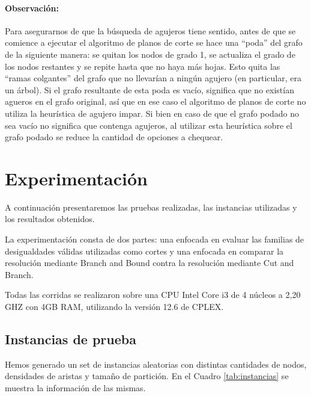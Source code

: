 \documentclass[a4paper]{article}
\begin{document}
\paragraph*{Observación: } Para asegurarnos de que la búsqueda de agujeros tiene sentido, antes de que se comience a ejecutar el algoritmo de planos de corte se hace una ``poda'' del grafo de la siguiente manera: se quitan los nodos de grado 1, se actualiza el grado de los nodos restantes y se repite hasta que no haya más hojas.  Esto quita las ``ramas colgantes'' del grafo que no llevarían a ningún agujero (en particular, era un árbol). Si el grafo resultante de esta poda es vacío, significa que no existían agueros en el grafo original, así que en ese caso el algoritmo de planos de corte no utiliza la heurística de agujero impar. Si bien en caso de que el grafo podado no sea vacío no significa que contenga agujeros, al utilizar esta heurística sobre el grafo podado se reduce la cantidad de opciones a chequear.

\newpage

\section{Experimentación}

A continuación presentaremos las pruebas realizadas, las instancias utilizadas y los resultados obtenidos.

La experimentación consta de dos partes: una enfocada en evaluar las familias de desigualdades válidas utilizadas como cortes y una enfocada en comparar la resolución mediante Branch and Bound contra la resolución mediante Cut and Branch.

Todas las corridas se realizaron sobre una CPU Intel Core i3 de 4 núcleos a 2,20 GHZ con 4GB RAM, utilizando la versión 12.6 de CPLEX.

\subsection{Instancias de prueba}


Hemos generado un set de instancias aleatorias con distintas cantidades de nodos, densidades de aristas y tamaño de partición. En el Cuadro \ref{tab:instancias} se muestra la información de las mismas.
\end{document}
